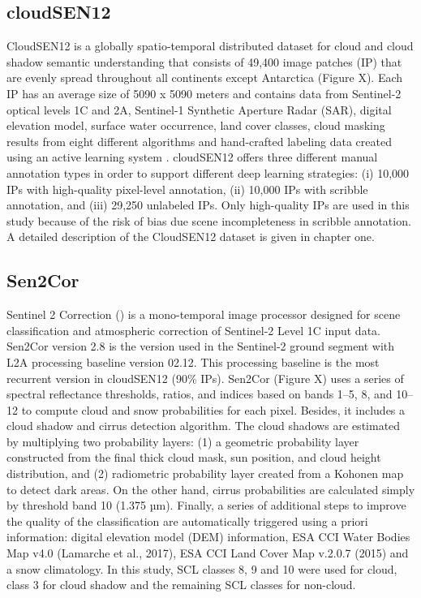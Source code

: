 \documentclass[a4paper, nobind]{templates/cdethesis}
\begin{document}
\hypertarget{cloudsen12}{%
\subsection{cloudSEN12}\label{cloudsen12}}

CloudSEN12 is a globally spatio-temporal distributed dataset for cloud and cloud shadow semantic understanding that consists of 49,400 image patches (IP) that are evenly spread throughout all continents except Antarctica (Figure X). Each IP has an average size of 5090 x 5090 meters and contains data from Sentinel-2 optical levels 1C and 2A, Sentinel-1 Synthetic Aperture Radar (SAR), digital elevation model, surface water occurrence, land cover classes, cloud masking results from eight different algorithms and hand-crafted labeling data created using an active learning system \cite{francis_alistair_2020_4172871}. cloudSEN12 offers three different manual annotation types in order to support different deep learning strategies: (i) 10,000 IPs with high-quality pixel-level annotation, (ii) 10,000 IPs with scribble annotation, and (iii) 29,250 unlabeled IPs. Only high-quality IPs are used in this study because of the risk of bias due scene incompleteness in scribble annotation. A detailed description of the CloudSEN12 dataset is given in chapter one.

\hypertarget{sen2cor}{%
\subsection{Sen2Cor}\label{sen2cor}}

Sentinel 2 Correction (\cite{Louis2016}) is a mono-temporal image processor designed for
scene classification and atmospheric correction of Sentinel-2 Level 1C input data. Sen2Cor version 2.8 is the version used in the Sentinel-2 ground segment with L2A processing baseline version 02.12. This processing baseline is the most recurrent version in cloudSEN12 (90\% IPs). Sen2Cor (Figure X) uses a series of spectral reflectance thresholds, ratios, and indices based on bands 1--5, 8, and 10--12 to compute cloud and snow probabilities for each pixel. Besides, it includes a cloud shadow and cirrus detection algorithm. The cloud shadows are estimated by multiplying two probability layers: (1) a geometric probability layer constructed from the
final thick cloud mask, sun position, and cloud height distribution, and (2) radiometric probability layer created from a Kohonen map to detect dark areas. On the other hand, cirrus probabilities are calculated simply by threshold band 10 (1.375 µm). Finally, a series of additional steps to improve the quality of the classification are automatically triggered using a priori information: digital elevation model (DEM) information, ESA CCI Water Bodies Map v4.0 (Lamarche et al., 2017), ESA CCI Land Cover Map v.2.0.7 (2015) and a snow climatology. In this study, SCL classes 8, 9 and 10 were used for cloud, class 3 for cloud shadow and the remaining SCL classes for non-cloud.
\end{document}
